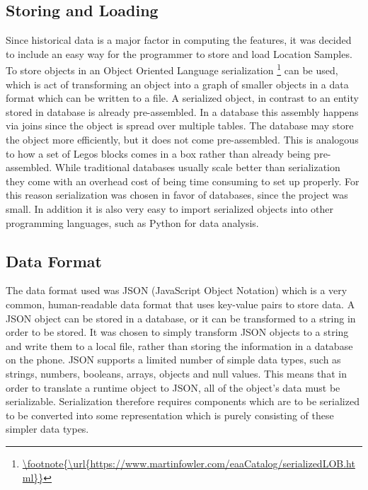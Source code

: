 \subsection{Storing and Loading}
Since historical data is a major factor in computing the features, it was decided to include an easy way for the programmer to store and load Location Samples. To store objects in an Object Oriented Language serialization \footnote{\url{\footnote{\url{https://www.martinfowler.com/eaaCatalog/serializedLOB.html}}}} can be used, which is act of transforming an object into a graph of smaller objects in a data format which can be written to a file. A serialized object, in contrast to an entity stored in database is already pre-assembled. In a database this assembly happens via joins since the object is spread over multiple tables. The database may store the object more efficiently, but it does not come pre-assembled. This is analogous to how a set of Legos blocks comes in a box rather than already being pre-assembled. While traditional databases usually scale better than serialization they come with an overhead cost of being time consuming to set up properly. For this reason serialization was chosen in favor of databases,  since the project was small. In addition it is also very easy to import serialized objects into other programming languages, such as Python for data analysis. 

\subsection{Data Format}
The data format used was JSON (JavaScript Object Notation) which is a very common, human-readable data format that uses key-value pairs to store data. A JSON object can be stored in a database, or it can be transformed to a string in order to be stored. It was chosen to simply transform JSON objects to a string and write them to a local file, rather than storing the information in a database on the phone. JSON supports a limited number of simple data types, such as strings, numbers, booleans, arrays, objects and null values. This means that in order to translate a runtime object to JSON, all of the object's data must be serializable. Serialization therefore requires components which are to be serialized to be converted into some representation which is purely consisting of these simpler data types.

